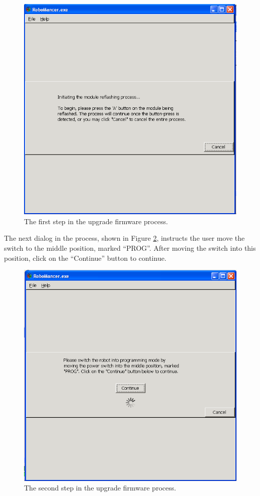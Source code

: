\documentclass{article}
\begin{document}
\begin{figure}[H]
\begin{center}
\includegraphics[width=4.5in]{images/update2.png}
\end{center}
\caption{\label{fig:update2} The first step in the upgrade firmware process.}
\end{figure}

The next dialog in the process, shown in Figure \ref{fig:update3}, instructs
the user move the switch to the middle position, marked ``PROG''. After moving the
switch into this position, click on the ``Continue'' button to continue.

\begin{figure}[H]
\begin{center}
\includegraphics[width=4.5in]{images/reset3.png}
\end{center}
\caption{\label{fig:update3} The second step in the upgrade firmware process.}
\end{figure}
\end{document}
